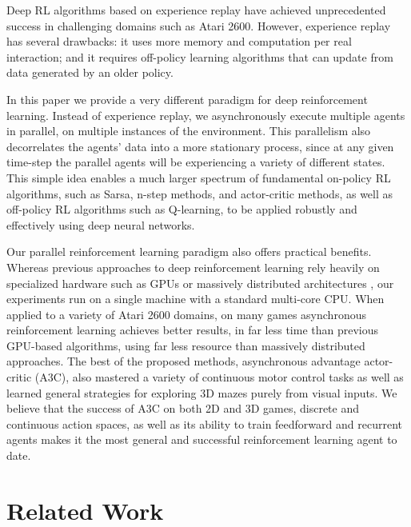 \documentclass{article} \usepackage{times}
\begin{document}
Deep RL algorithms based on experience replay have achieved unprecedented success in challenging domains such as Atari 2600.
However, experience replay has several drawbacks: it uses more memory and computation per real interaction; and it requires off-policy learning algorithms that can update from data generated by an older policy.

In this paper we provide a very different paradigm for deep reinforcement learning.
Instead of experience replay, we asynchronously execute multiple agents in parallel, on multiple instances of the environment.
This parallelism also decorrelates the agents' data into a more stationary process, since at any given time-step the parallel agents will be experiencing a variety of different states.
This simple idea enables a much larger spectrum of fundamental on-policy RL algorithms, such as Sarsa, n-step methods, and actor-critic methods, as well as off-policy RL algorithms such as Q-learning, to be applied robustly and effectively using deep neural networks.

Our parallel reinforcement learning paradigm also offers practical benefits.
Whereas previous approaches to deep reinforcement learning rely heavily on specialized hardware such as GPUs \citep{mnih-dqn-2015,hado2015doubledqn,schaul2015prioritized} or massively distributed architectures \citep{nair2015gorila}, our experiments run on a single machine with a standard multi-core CPU.
When applied to a variety of Atari 2600 domains, on many games asynchronous reinforcement learning achieves better results, in far less time than previous GPU-based algorithms, using far less resource than massively distributed approaches.
The best of the proposed methods, asynchronous advantage actor-critic (A3C), also mastered a variety of continuous motor control tasks as well as learned general strategies for exploring 3D mazes purely from visual inputs.
We believe that the success of A3C on both 2D and 3D games, discrete and continuous action spaces, as well as its ability to train feedforward and recurrent agents makes it the most general and successful reinforcement learning agent to date.
 \vspace{-0.1cm}
\section{Related Work}
\label{sec:related}
\end{document}
